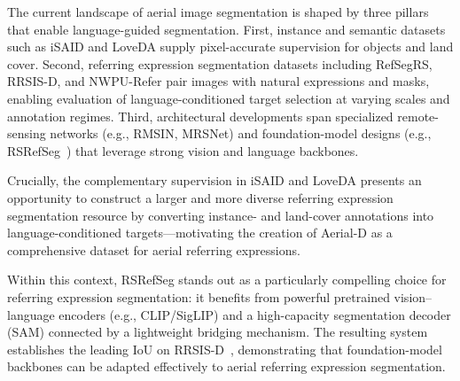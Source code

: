 The current landscape of aerial image segmentation is shaped by three pillars that enable language-guided segmentation. First, instance and semantic datasets such as iSAID and LoveDA supply pixel-accurate supervision for objects and land cover. Second, referring expression segmentation datasets including RefSegRS, RRSIS-D, and NWPU-Refer pair images with natural expressions and masks, enabling evaluation of language-conditioned target selection at varying scales and annotation regimes. Third, architectural developments span specialized remote-sensing networks (e.g., RMSIN, MRSNet) and foundation-model designs (e.g., RSRefSeg~\cite{chen2025rsrefseg}) that leverage strong vision and language backbones.

Crucially, the complementary supervision in iSAID and LoveDA presents an opportunity to construct a larger and more diverse referring expression segmentation resource by converting instance- and land-cover annotations into language-conditioned targets—motivating the creation of Aerial-D as a comprehensive dataset for aerial referring expressions.

Within this context, RSRefSeg stands out as a particularly compelling choice for referring expression segmentation: it benefits from powerful pretrained vision–language encoders (e.g., CLIP/SigLIP) and a high-capacity segmentation decoder (SAM) connected by a lightweight bridging mechanism. The resulting system establishes the leading IoU on RRSIS-D~\cite{chen2025rsrefseg}, demonstrating that foundation-model backbones can be adapted effectively to aerial referring expression segmentation.